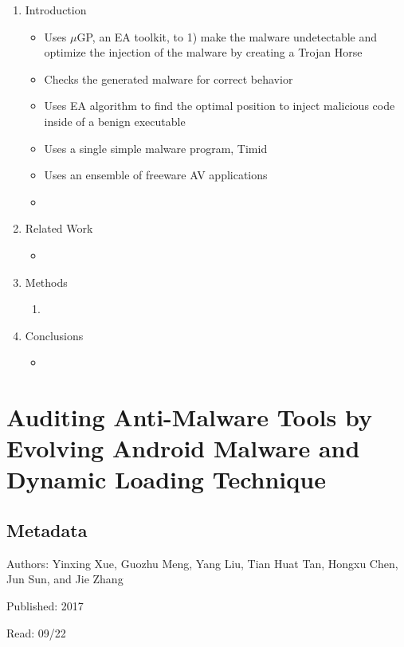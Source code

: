 \documentclass{article}
\begin{document}
\begin{enumerate}
	\item Introduction
	\begin{itemize}
		\item Uses $\mu$GP, an EA toolkit, to 1) make the malware undetectable and optimize the injection of the malware by creating a Trojan Horse
		\item Checks the generated malware for correct behavior
		\item Uses EA algorithm to find the optimal position to inject malicious code inside of a benign executable
		\item Uses a single simple malware program, Timid
		\item Uses an ensemble of freeware AV applications
		\item 
	\end{itemize}
	\item Related Work
	\begin{itemize}
		\item 
	\end{itemize}
	\item Methods
	\begin{enumerate}
		\item 
	\end{enumerate}
	\item Conclusions
	\begin{itemize}
		\item 
	\end{itemize}
\end{enumerate}

\pagebreak


\section*{Auditing Anti-Malware Tools by Evolving Android Malware and Dynamic Loading Technique}

\subsection*{Metadata}

\noindent Authors: Yinxing Xue, Guozhu Meng, Yang Liu, Tian Huat Tan, Hongxu Chen, Jun Sun, and Jie Zhang

\noindent Published: 2017

\noindent Read: 09/22
\end{document}
